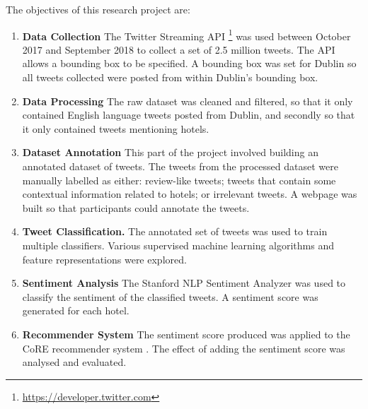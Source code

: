The objectives of this research project are:
\begin{enumerate}
    \item \textbf{Data Collection}\newline
    The Twitter Streaming API \footnote{\url{https://developer.twitter.com}} was used between October 2017 and September 2018 to collect a set of 2.5 million tweets. The API allows a bounding box to be specified. A bounding box was set for Dublin so all tweets collected were posted from within Dublin's bounding box.
    \item \textbf{Data Processing}\newline
    The raw dataset was cleaned and filtered, so that it only contained English language tweets posted from Dublin, and secondly so that it only contained tweets mentioning hotels.
    \item \textbf{Dataset Annotation} \newline
    This part of the project involved building an annotated dataset of tweets. The tweets from the processed dataset were manually labelled as either: review-like tweets; tweets that contain some contextual information related to hotels; or irrelevant tweets. A webpage was built so that participants could annotate the tweets.
    \item \textbf{Tweet Classification.}\newline
    The annotated set of tweets was used to train multiple classifiers. Various supervised machine learning algorithms and feature representations were explored.
    \item \textbf{Sentiment Analysis}\newline
    The Stanford NLP Sentiment Analyzer \cite{stanfordSentiment2013} was used to classify the sentiment of the classified tweets. A sentiment score was generated for each hotel.
    \item \textbf{Recommender System}\newline
    The sentiment score produced was applied to the CoRE recommender system \cite{core2019}. The effect of adding the sentiment score was analysed and evaluated.
\end{enumerate}

